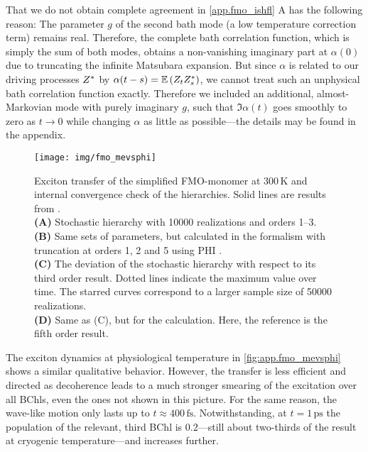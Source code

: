 That we do not obtain complete agreement in \autoref{app.fmo_ishfl} A has the following reason:
The parameter $g$ of the second bath mode (a low temperature correction term) remains real.
Therefore, the complete bath correlation function, which is simply the sum of both modes, obtains a non-vanishing imaginary part at $\alpha(0)$ due to truncating the infinite Matsubara expansion.
But since $\alpha$ is related to our driving processes ${Z}^*$ by $\alpha(t-s) = \E[Z_t \ZZ_s]$, we cannot treat such an unphysical bath correlation function exactly.
Therefore we included an additional, almost-Markovian mode with purely imaginary $g$, such that $\Im\alpha(t)$ goes smoothly to zero as $t \to 0$ while changing $\alpha$ as little as possible---the details may be found in the appendix.\\



\begin{figure}[p]
  \centering
  \texttt{[image: img/fmo\_mevsphi]}
  \caption{%
    Exciton transfer of the simplified FMO-monomer at 300\,K and internal convergence check of the hierarchies. Solid lines are results from \cite{IsFl09_fmo}.\\
    \textbf{(A)} Stochastic hierarchy with 10000 realizations and orders 1--3.\\
    \textbf{(B)} Same sets of parameters, but calculated in the \HEOM formalism with truncation at orders 1, 2 and 5 using \textsc{PHI} \cite{StSc12_heom}.\\
    \textbf{(C)} The deviation of the stochastic hierarchy with respect to its third order result. Dotted lines indicate the maximum value over time. The starred curves correspond to a larger sample size of 50000 realizations.\\
    \textbf{(D)} Same as (C), but for the \HEOM calculation. Here, the reference is the fifth order result.
  }
  \label{fig:app.fmo_mevsphi}
\end{figure}

The exciton dynamics at physiological temperature in \autoref{fig:app.fmo_mevsphi} shows a similar qualitative behavior.
However, the transfer is less efficient and directed as decoherence leads to a much stronger smearing of the excitation over all BChls, even the ones not shown in this picture.
For the same reason, the wave-like motion only lasts up to $t \approx 400\,\mathrm{fs}$.
Notwithstanding, at $t = 1\,\mathrm{ps}$ the population of the relevant, third BChl is $0.2$---still about two-thirds of the result at cryogenic temperature---and increases further.

